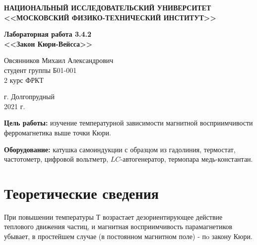 \documentclass[a4paper,12pt]{article} %
\begin{document}
	\begin{center}
		
		\textbf{НАЦИОНАЛЬНЫЙ ИССЛЕДОВАТЕЛЬСКИЙ УНИВЕРСИТЕТ \\ <<МОСКОВСКИЙ ФИЗИКО-ТЕХНИЧЕСКИЙ ИНСТИТУТ>>}
		\vspace{13ex}
		
		\textbf{Лабораторная работа 3.4.2 \\ <<Закон Кюри-Вейсса>> }
		\vspace{60ex}
		
		\normalsize{Овсянников Михаил Александрович \\ студент группы Б01-001\\ 2 курс ФРКТ\\}
	\end{center}
	
	\vfill 
	
	\begin{center}
		г. Долгопрудный\\ 
		2021 г.
	\end{center}
	
	\thispagestyle{empty} %
	
	\newpage
	
	
	
\textbf{Цель работы:} изучение температурной зависимости магнитной восприимчивости ферромагнетика выше точки Кюри.

\vspace{5mm}	
\textbf{Оборудование:} катушка самоиндукции с образцом из гадолиния, термостат, частотометр, цифровой вольтметр, $ LC$-автогенератор, термопара медь-константан.


\section*{Теоретические сведения}

При повышении температуры $Т$ возрастает дезориентирующее действие теплового движения частиц, и магнитная восприимчивость парамагнетиков убывает, в простейшем случае (в постоянном магнитном поле) - пo закону Кюри.
\end{document}

